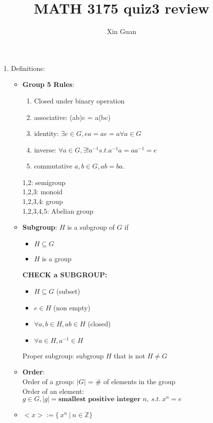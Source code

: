 \documentclass[12pt]{article}
\title{MATH 3175 quiz3 review}
\date{}
\author{Xin Guan}
\begin{document}
    \begin{enumerate}
        \item Definitions:
        \begin{itemize}
            \item \textbf{Group 5 Rules}:
            \begin{enumerate}
                \item Closed under binary operation
                \item associative: (ab)c = a(bc)
                \item identity: $\exists e \in G, ea = ae = a \forall a \in G$
                \item inverse: $\forall a \in G, \exists! a^{-1} s.t. a^{-1}a = aa^{-1} = e$
                \item commutative $a,b \in G, ab = ba$.
            \end{enumerate}
            1,2: semigroup\\
            1,2,3: monoid\\
            1,2,3,4: group\\
            1,2,3,4,5: Abelian group
            \item \textbf{Subgroup}: $H$ is a subgroup of $G$ if
            \begin{itemize}
                \item $H \subseteq G$
                \item $H$ is a group
            \end{itemize}
            \textbf{CHECK a SUBGROUP:}
            \begin{itemize}
                \item $H \subseteq G$ (subset)
                \item $e \in H$ (non empty)
                \item $\forall a,b \in H, ab \in H$ (closed)
                \item $\forall a \in H, a^{-1} \in H$
            \end{itemize}
            Proper subgroup: subgroup $H$ that is not $H \ne G$
            \item \textbf{Order}:\\
            Order of a group: $|G|$ = \# of elements in the group\\
            Order of an element: $g\in G, |g| = \textbf{smallest positive integer }n, \ s.t. \ x^n = e$
            \item $<x> := \{\ x^n \ | \ n \in \mathbb{Z}\}$

\end{itemize}
\end{enumerate}
\end{document}
